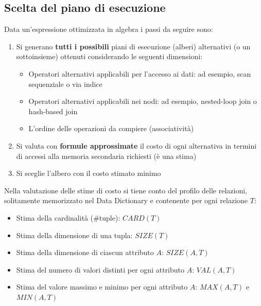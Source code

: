 \documentclass[a4paper,twoside]{article}
\begin{document}
\subsection{Scelta del piano di esecuzione}
Data un'espressione ottimizzata in algebra i passi da seguire sono:
\begin{enumerate}
  \item Si generano \textbf{tutti i possibili} piani di esecuzione (alberi) alternativi
    (o un sottoinsieme) ottenuti considerando le seguenti dimensioni:
    \begin{itemize}
      \item Operatori alternativi applicabili per l'accesso ai dati: ad esempio, scan
        sequenziale o via indice

      \item Operatori alternativi applicabili nei nodi: ad esempio, nested-loop join o
        hash-based join

      \item L'ordine delle operazioni da compiere (associatività)
    \end{itemize}

  \item Si valuta con \textbf{formule approssimate} il costo di ogni alternativa in
    termini di accessi alla memoria secondaria richiesti (è una stima)

  \item Si sceglie l'albero con il costo stimato minimo
\end{enumerate}

\vspace{1em}
\noindent
Nella valutazione delle stime di costo si tiene conto del profilo delle relazioni,
solitamente memorizzato nel Data Dictionary e contenente per ogni relazione \( T \):
\begin{itemize}
  \item Stima della cardinalità (\#tuple): \( CARD(T) \)
  \item Stima della dimensione di una tupla: \( SIZE(T) \)
  \item Stima della dimensione di ciascun attributo \( A \): \( SIZE(A,T) \)
  \item Stima del numero di valori distinti per ogni attributo \( A \): \( VAL(A,T) \)
  \item Stima del valore massimo e minimo per ogni attributo \( A \): \( MAX(A,T) \) e \( MIN(A,T) \)
\end{itemize}
\end{document}
